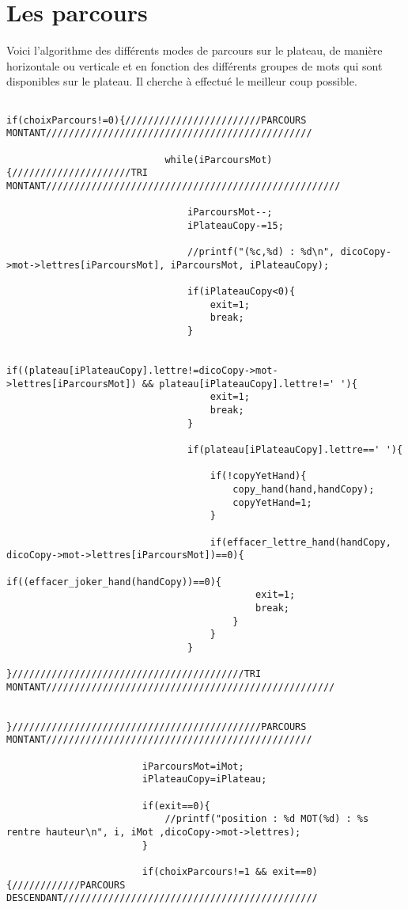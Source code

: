 \documentclass[a4paper]{article}
\begin{document}
\section{Les parcours}

Voici l'algorithme des différents modes de parcours sur le plateau, de manière horizontale ou verticale et en fonction des différents groupes de mots qui sont disponibles sur le plateau. Il cherche à effectué le meilleur coup possible.

\begin{verbatim}

if(choixParcours!=0){////////////////////////PARCOURS MONTANT///////////////////////////////////////////////

							while(iParcoursMot){/////////////////////TRI MONTANT////////////////////////////////////////////////////

								iParcoursMot--;
								iPlateauCopy-=15;

								//printf("(%c,%d) : %d\n", dicoCopy->mot->lettres[iParcoursMot], iParcoursMot, iPlateauCopy);

								if(iPlateauCopy<0){
									exit=1;
									break;
								}

								if((plateau[iPlateauCopy].lettre!=dicoCopy->mot->lettres[iParcoursMot]) && plateau[iPlateauCopy].lettre!=' '){
									exit=1;
									break;
								}

								if(plateau[iPlateauCopy].lettre==' '){

									if(!copyYetHand){
										copy_hand(hand,handCopy);
										copyYetHand=1;
									}

									if(effacer_lettre_hand(handCopy, dicoCopy->mot->lettres[iParcoursMot])==0){
										if((effacer_joker_hand(handCopy))==0){
											exit=1;
											break;
										}
									}
								}
							}/////////////////////////////////////////TRI MONTANT///////////////////////////////////////////////////

						}////////////////////////////////////////////PARCOURS MONTANT///////////////////////////////////////////////

						iParcoursMot=iMot;
						iPlateauCopy=iPlateau;

						if(exit==0){
							//printf("position : %d MOT(%d) : %s rentre hauteur\n", i, iMot ,dicoCopy->mot->lettres);
						}

						if(choixParcours!=1 && exit==0){////////////PARCOURS DESCENDANT/////////////////////////////////////////////


\end{verbatim}
\end{document}
